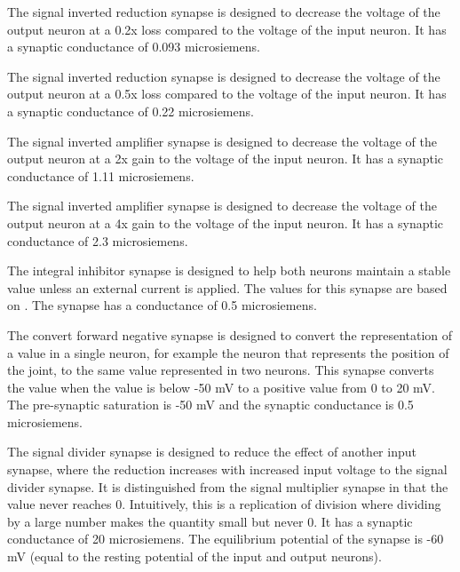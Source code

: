 
The signal inverted reduction synapse is designed to decrease the voltage of
the output 
neuron at a 0.2x loss compared to the voltage of the input neuron. It has a 
synaptic conductance of 0.093 microsiemens.


The signal inverted reduction synapse is designed to decrease the voltage of
the output 
neuron at a 0.5x loss compared to the voltage of the input neuron. It has a 
synaptic conductance of 0.22 microsiemens.


The signal inverted amplifier synapse is designed to decrease the voltage of
the output 
neuron at a 2x gain to the voltage of the input neuron. It has a synaptic 
conductance of 1.11 microsiemens.


The signal inverted amplifier synapse is designed to decrease the voltage of
the output 
neuron at a 4x gain to the voltage of the input neuron. It has a synaptic 
conductance of 2.3 microsiemens.


The integral inhibitor synapse is designed to help both neurons maintain a 
stable value unless an external current is applied. The values for this
synapse are based on \cite{NickFunctionalSubnetwork}. The synapse has a  
conductance of 0.5 microsiemens.


The convert forward negative synapse is designed to convert the representation
of a value in a single neuron, for example the neuron that represents the 
position of the joint, to the same value represented in two neurons. This
synapse converts the value when the value is below -50 mV to a positive value 
from 0 to 20 mV. The pre-synaptic
saturation is -50 mV and the synaptic conductance is 0.5 microsiemens.


The signal divider synapse is designed to reduce the effect of another input
synapse, where the reduction increases with increased input voltage to the
signal divider synapse. It is distinguished from the signal multiplier synapse
in that the value never reaches 0. Intuitively, this is a replication of 
division where dividing by a large number makes the quantity small but never 0.
It has a synaptic conductance of 20 microsiemens. The equilibrium potential of
the synapse is -60 mV (equal to the resting potential of the input and output
neurons).

